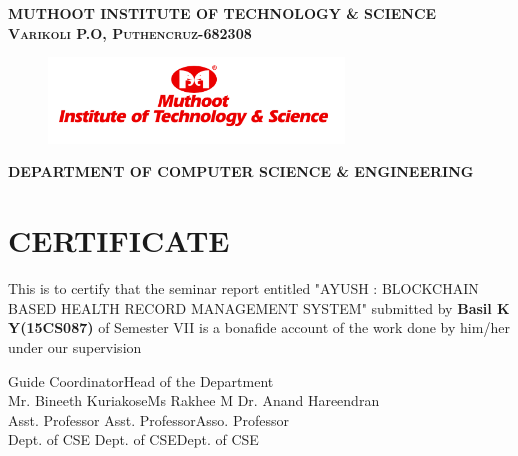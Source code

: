 \documentclass[12pt]{report}
\begin{document}
\newpage\begin{titlepage}
\center


\textsc{ \textbf{MUTHOOT INSTITUTE OF TECHNOLOGY \& SCIENCE}}\\
\textsc{\textbf{Varikoli P.O, Puthencruz-682308}}
\vspace{0.7cm}
\begin{figure}[H]
\centering
\includegraphics[width=0.7\textwidth]{logo.png}\\
\end{figure}
\vspace{0.2cm}
\textsc{ \small \textbf{ DEPARTMENT OF COMPUTER SCIENCE \& ENGINEERING}}\\
\section*{\centering CERTIFICATE}
\begin{center}
 This is to certify that the seminar report entitled "AYUSH : BLOCKCHAIN BASED HEALTH RECORD MANAGEMENT SYSTEM" submitted by \textbf{Basil K Y(15CS087)} of Semester VII is  a bonafide account of the work done by him/her under our supervision\\
\end{center}
\vspace{1.6cm}




\noindent Guide \hspace{3.6cm} Coordinator\hfill Head of the Department
\\
\noindent Mr. Bineeth Kuriakose\hspace{0.82cm}Ms Rakhee M \hfill Dr. Anand Hareendran\\
\noindent Asst. Professor\hspace{2.05cm} Asst. Professor\hfill Asso. Professor\\
\noindent Dept. of CSE\hspace{2.3cm} Dept. of CSE\hfill Dept. of CSE




\end{titlepage}
\newpage
{}
\end{document}
